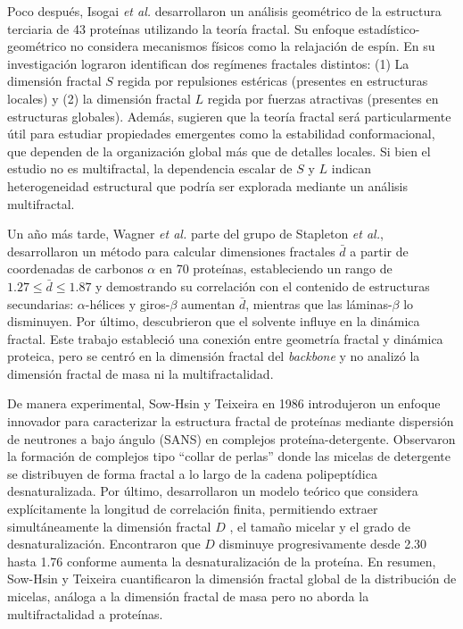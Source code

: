Poco despu\'{e}s, Isogai \textit{et al.} \cite{Isogai1984} desarrollaron un an\'{a}lisis geom\'{e}trico de la estructura terciaria de 43 prote\'{i}nas utilizando la teor\'{i}a fractal. Su enfoque  estad\'{i}stico-geom\'{e}trico no considera mecanismos f\'{i}sicos como la relajaci\'{o}n de esp\'{i}n.
En su investigaci\'{o}n lograron identifican dos reg\'{i}menes fractales distintos: (1) La dimensi\'{o}n fractal $S$ regida por repulsiones est\'{e}ricas (presentes en estructuras locales) y (2) la dimensi\'{o}n fractal $L$ regida por fuerzas atractivas (presentes en estructuras globales). Adem\'{a}s, sugieren que la teor\'{i}a fractal ser\'{a} particularmente \'{u}til para estudiar propiedades emergentes como la estabilidad conformacional, que dependen de la organizaci\'{o}n global m\'{a}s que de detalles locales. Si bien el estudio no es multifractal, la dependencia escalar de $S$ y $L$ indican heterogeneidad estructural que podría ser explorada mediante un análisis multifractal.


Un año m\'{a}s tarde, Wagner \textit{et al.} \cite{Wagner1985} parte  del grupo de Stapleton \textit{et al.}, desarrollaron un m\'{e}todo para calcular dimensiones fractales $\bar{d}$ a partir de coordenadas de carbonos $\alpha$ en 70 prote\'{i}nas, estableciendo un rango de $1.27 \leq \bar{d} \leq 1.87$ y demostrando su correlaci\'{o}n con el contenido de estructuras secundarias: $\alpha$-h\'{e}lices y giros-$\beta$ aumentan $\bar{d}$, mientras que las l\'{a}minas-$\beta$ lo disminuyen. Por \'{u}ltimo, descubrieron que el solvente influye en la din\'{a}mica fractal. Este trabajo estableció una conexión entre geometría fractal y dinámica proteica, pero se centró en la dimensión fractal del \textit{backbone} y no analizó la dimensión fractal de masa ni la multifractalidad.



De manera experimental, Sow-Hsin y Teixeira \cite{Chen1986} en 1986 introdujeron un enfoque innovador para caracterizar la estructura fractal de prote\'{i}nas mediante dispersi\'{o}n de neutrones a bajo \'{a}ngulo (SANS) en complejos prote\'{i}na-detergente. Observaron la formaci\'{o}n de complejos tipo ``collar de perlas'' donde las micelas de detergente se distribuyen de forma fractal a lo largo de la cadena polipept\'{i}dica desnaturalizada. Por \'{u}ltimo, desarrollaron un modelo te\'{o}rico que considera expl\'{i}citamente la longitud de correlaci\'{o}n finita, permitiendo extraer simult\'{a}neamente la dimensi\'{o}n fractal $D$ , el tamaño micelar y el grado de desnaturalizaci\'{o}n. Encontraron que $D$ disminuye progresivamente desde 2.30 hasta 1.76 conforme aumenta la desnaturalizaci\'{o}n de la prote\'{i}na. En resumen, Sow-Hsin y Teixeira cuantificaron la dimensión fractal global de la distribución de micelas, análoga a la dimensión fractal de masa pero no aborda la multifractalidad a proteínas.


